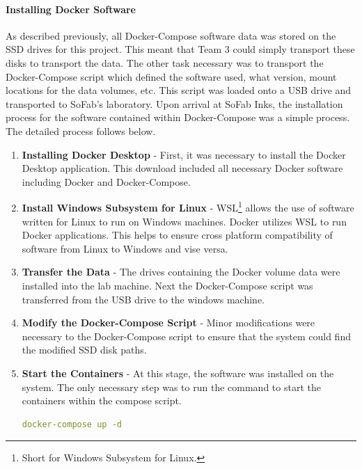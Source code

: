 \documentclass{article}
\begin{document}
\paragraph{Installing Docker Software} As described
previously, all Docker-Compose software data was stored on the SSD drives for this project. This meant that Team 3 could simply 
transport these disks to transport the data. The other task necessary was to transport the Docker-Compose script which defined the 
software used, what version, mount locations for the data volumes, etc. This script was loaded onto a USB drive and transported to 
SoFab's laboratory. Upon arrival at SoFab Inks, the installation process for the software contained within Docker-Compose was a simple 
process. The detailed process follows below.

\begin{enumerate}
    \item \textbf{Installing Docker Desktop} - First, it was necessary to install the Docker Desktop application. This download included 
        all necessary Docker software including Docker and Docker-Compose. 
    \item \textbf{Install Windows Subsystem for Linux} - WSL\footnote{Short for Windows Subsystem for Linux.} allows the use of software 
        written for Linux to run on Windows machines. Docker utilizes WSL to run Docker applications. This helps to ensure cross platform
        compatibility of software from Linux to Windows and vise versa. 
    \item \textbf{Transfer the Data} - The drives containing the Docker volume data were installed into the lab machine. Next the 
        Docker-Compose script was transferred from the USB drive to the windows machine. 
    \item \textbf{Modify the Docker-Compose Script} - Minor modifications were necessary to the Docker-Compose script to ensure 
        that the system could find the modified SSD disk paths. 
    \item \textbf{Start the Containers} - At this stage, the software was installed on the system. The only necessary step was to run the 
        command to start the containers within the compose script. 

         \begin{lstlisting}[language=yaml]
        docker-compose up -d
        \end{lstlisting}
\end{enumerate}
\end{document}
